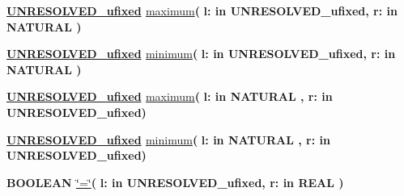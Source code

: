 \begin{DoxyCompactItemize}
\item 
{\bfseries {\bfseries {\bfseries \hyperlink{classfixed__pkg_ae78bc2b36d22f6abeac163955e8a587d}{U\+N\+R\+E\+S\+O\+L\+V\+E\+D\+\_\+ufixed}} \textcolor{vhdlchar}{ }}} \hyperlink{classfixed__pkg_a8e1abbe4534fa7d5dea9fee275da3723}{maximum}{\bfseries  ( }{\bfseries \textcolor{vhdlchar}{l\+: }\textcolor{stringliteral}{in }\textcolor{vhdlchar}{U\+N\+R\+E\+S\+O\+L\+V\+E\+D\+\_\+ufixed}}{\bfseries  , \textcolor{vhdlchar}{r\+: }\textcolor{stringliteral}{in }{\bfseries \textcolor{comment}{N\+A\+T\+U\+R\+A\+L}\textcolor{vhdlchar}{ }}}{\bfseries  )} 
\item 
{\bfseries {\bfseries {\bfseries \hyperlink{classfixed__pkg_ae78bc2b36d22f6abeac163955e8a587d}{U\+N\+R\+E\+S\+O\+L\+V\+E\+D\+\_\+ufixed}} \textcolor{vhdlchar}{ }}} \hyperlink{classfixed__pkg_ae6f8be7af801cf9cb3dcc7b877059955}{minimum}{\bfseries  ( }{\bfseries \textcolor{vhdlchar}{l\+: }\textcolor{stringliteral}{in }\textcolor{vhdlchar}{U\+N\+R\+E\+S\+O\+L\+V\+E\+D\+\_\+ufixed}}{\bfseries  , \textcolor{vhdlchar}{r\+: }\textcolor{stringliteral}{in }{\bfseries \textcolor{comment}{N\+A\+T\+U\+R\+A\+L}\textcolor{vhdlchar}{ }}}{\bfseries  )} 
\item 
{\bfseries {\bfseries {\bfseries \hyperlink{classfixed__pkg_ae78bc2b36d22f6abeac163955e8a587d}{U\+N\+R\+E\+S\+O\+L\+V\+E\+D\+\_\+ufixed}} \textcolor{vhdlchar}{ }}} \hyperlink{classfixed__pkg_a8e1abbe4534fa7d5dea9fee275da3723}{maximum}{\bfseries  ( }{\bfseries \textcolor{vhdlchar}{l\+: }\textcolor{stringliteral}{in }{\bfseries \textcolor{comment}{N\+A\+T\+U\+R\+A\+L}\textcolor{vhdlchar}{ }}}{\bfseries  , \textcolor{vhdlchar}{r\+: }\textcolor{stringliteral}{in }\textcolor{vhdlchar}{U\+N\+R\+E\+S\+O\+L\+V\+E\+D\+\_\+ufixed}}{\bfseries  )} 
\item 
{\bfseries {\bfseries {\bfseries \hyperlink{classfixed__pkg_ae78bc2b36d22f6abeac163955e8a587d}{U\+N\+R\+E\+S\+O\+L\+V\+E\+D\+\_\+ufixed}} \textcolor{vhdlchar}{ }}} \hyperlink{classfixed__pkg_ae6f8be7af801cf9cb3dcc7b877059955}{minimum}{\bfseries  ( }{\bfseries \textcolor{vhdlchar}{l\+: }\textcolor{stringliteral}{in }{\bfseries \textcolor{comment}{N\+A\+T\+U\+R\+A\+L}\textcolor{vhdlchar}{ }}}{\bfseries  , \textcolor{vhdlchar}{r\+: }\textcolor{stringliteral}{in }\textcolor{vhdlchar}{U\+N\+R\+E\+S\+O\+L\+V\+E\+D\+\_\+ufixed}}{\bfseries  )} 
\item 
{\bfseries {\bfseries \textcolor{comment}{B\+O\+O\+L\+E\+A\+N}\textcolor{vhdlchar}{ }}} \hyperlink{classfixed__pkg_a7949e9258ea0749e3b35961feea8db87}{\char`\"{}=\char`\"{}}{\bfseries  ( }{\bfseries \textcolor{vhdlchar}{l\+: }\textcolor{stringliteral}{in }\textcolor{vhdlchar}{U\+N\+R\+E\+S\+O\+L\+V\+E\+D\+\_\+ufixed}}{\bfseries  , \textcolor{vhdlchar}{r\+: }\textcolor{stringliteral}{in }{\bfseries \textcolor{comment}{R\+E\+A\+L}\textcolor{vhdlchar}{ }}}{\bfseries  )} 

\end{DoxyCompactItemize}
